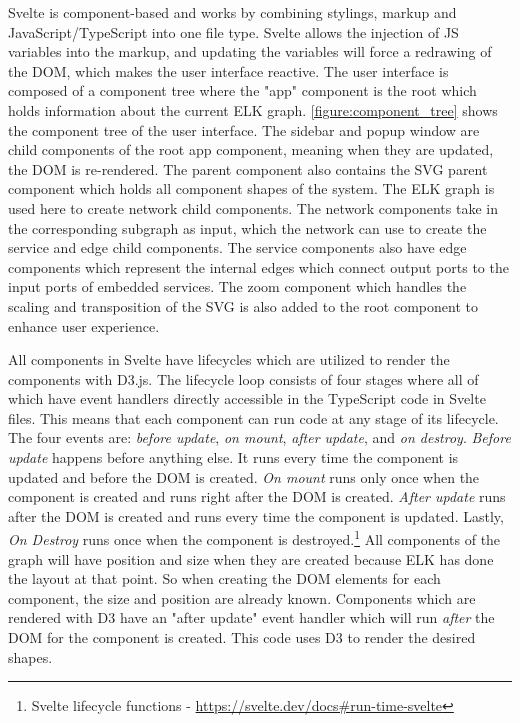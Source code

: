 Svelte is component-based and works by combining stylings, markup and JavaScript/TypeScript into one file type. Svelte allows the injection of JS variables into the markup, and updating the variables will force a redrawing of the DOM, which makes the user interface reactive.
The user interface is composed of a component tree where the "app" component is the root which holds information about the current ELK graph. \cref{figure:component_tree} shows the component tree of the user interface. The sidebar and popup window are child components of the root app component, meaning when they are updated, the DOM is re-rendered. 
The parent component also contains the SVG parent component which holds all component shapes of the system.
The ELK graph is used here to create network child components. The network components take in the corresponding subgraph as input, which the network can use to create the service and edge child components.
The service components also have edge components which represent the internal edges which connect output ports to the input ports of embedded services.
The zoom component which handles the scaling and transposition of the SVG is also added to the root component to enhance user experience.

All components in Svelte have lifecycles which are utilized to render the components with D3.js.
The lifecycle loop consists of four stages where all of which have event handlers directly accessible in the TypeScript code in Svelte files. This means that each component can run code at any stage of its lifecycle.
The four events are: \emph{before update}, \emph{on mount}, \emph{after update}, and \emph{on destroy}.
\emph{Before update} happens before anything else. It runs every time the component is updated and before the DOM is created.
\emph{On mount} runs only once when the component is created and runs right after the DOM is created. 
\emph{After update} runs after the DOM is created and runs every time the component is updated.
Lastly, \emph{On Destroy} runs once when the component is destroyed.\footnote{Svelte lifecycle functions - \url{https://svelte.dev/docs\#run-time-svelte}}
All components of the graph will have position and size when they are created because ELK has done the layout at that point.
So when creating the DOM elements for each component, the size and position are already known.
Components which are rendered with D3 have an "after update" event handler which will run \emph{after} the DOM for the component is created. This code uses D3 to render the desired shapes.

